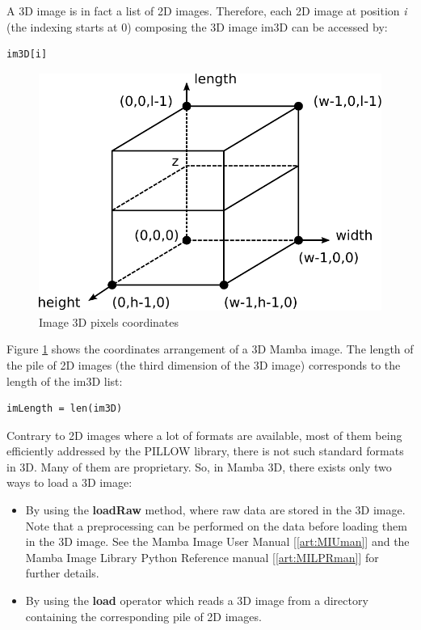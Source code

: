 \documentclass[a4paper,10pt,oneside]{article}
\begin{document}
A 3D image is in fact a list of 2D images. Therefore, each 2D image at position \emph{i} (the indexing starts at 0) composing the 3D image im3D can
be accessed by:

\lstset{language=Python}
\begin{lstlisting}
im3D[i]
\end{lstlisting}

\begin{figure}
\centering
\includegraphics[scale=0.8]{figures/image3D_coord.pdf}
\caption{Image 3D pixels coordinates}
\label{fig:image3D_coord}
\end{figure}

Figure \ref{fig:image3D_coord} shows the coordinates arrangement of a 3D Mamba image. The length of the pile of 2D images (the third
dimension of the 3D image) corresponds to the length of the im3D list:

\lstset{language=Python}
\begin{lstlisting}
imLength = len(im3D)
\end{lstlisting}

Contrary to 2D images where a lot of formats are available, most of them being efficiently addressed by the
PILLOW library, there is not such standard formats in 3D. Many of them are proprietary. So, in Mamba 3D, there
exists only two ways to load a 3D image:

\begin{itemize}
\item By using the \textbf{loadRaw} method, where raw data are stored in the 3D image. Note that a preprocessing can
be performed on the data before loading them in the 3D image. See the Mamba Image User Manual [\ref{art:MIUman}]
and the Mamba Image Library Python Reference manual [\ref{art:MILPRman}] for further details. 
\item By using the \textbf{load} operator which reads a 3D image from a directory containing the corresponding pile
of 2D images.
\end{itemize}
\end{document}
